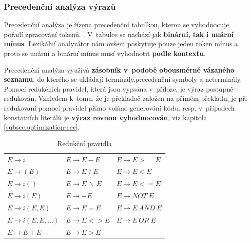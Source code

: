 \subsubsection{Precedenční analýza výrazů}

Precedenční analýza je řízena precedenční tabulkou, kterou se vyhodnocuje pořadí zpracování tokenů.
. V~tabulce se nachází jak \textbf{binární, tak i unární mínus}. Lexikální analyzátor nám ovšem poskytuje pouze jeden token mínus a proto se unární a binární mínus musí vyhodnotit \textbf{podle kontextu}.

Precedenční analýza využívá \textbf{zásobník v~podobě obousměrně vázaného seznamu}, do kterého se ukládají terminály,precedenční symboly a neterminály. Pomocí redukčních pravidel, která jsou vypsána v~příloze, je výraz postupně redukován.
Vzhledem k~tomu, že je překladač založen na přímém překladu, je při redukování pomocí pravidel přímo voláno generování kódu, resp. v~případech konstatních literálů je \textbf{výraz rovnou vyhodnocován}, viz kapitola \ref{subsec:optimization-cee}.

\begin{table}[!htbp]
    \centering
    \label{tabul:prav}
    \caption{Redukční pravidla}
    \begin{tabular}{lll}
        $E \to i$ & $E \to E - E$ & $E \to E >= E$\\
        $E \to (E)$ & $E \to E ~ / ~ E$ & $E \to E < E$\\
        $E \to i()$ & $E \to E ~ \backslash ~ E$ & $E \to E <= E$\\
        $E \to i(E)$ & $E \to - E$ & $E \to NOT ~ E$\\
        $E \to i(E, E)$ & $E \to E = E$ & $E \to E ~ AND ~ E$\\
        $E \to i(E, E, ...)$ & $E \to E <> E$ & $E \to E ~ OR ~ E$\\
        $E \to E + E$ & $E \to E > E$\\
    \end{tabular}
\end{table}

